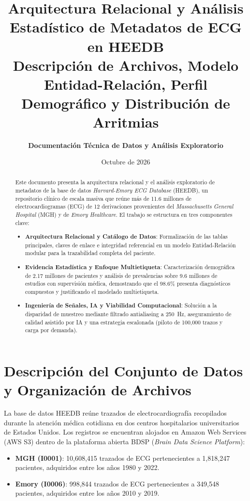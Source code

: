 \documentclass[11pt,a4paper]{article}
\title{\textbf{\LARGE Arquitectura Relacional y Análisis Estadístico de Metadatos de ECG en HEEDB}\\[0.25cm]
\large Descripción de Archivos, Modelo Entidad-Relación, Perfil Demográfico y Distribución de Arritmias}
\author{\textbf{Documentación Técnica de Datos y Análisis Exploratorio}}
\date{Octubre de 2026}
\begin{document}
\maketitle

\begin{abstract}
Este documento presenta la arquitectura relacional y el análisis exploratorio de metadatos de la base de datos \textit{Harvard-Emory ECG Database} (HEEDB), un repositorio clínico de escala masiva que reúne más de 11.6 millones de electrocardiogramas (ECG) de 12 derivaciones provenientes del \textit{Massachusetts General Hospital} (MGH) y de \textit{Emory Healthcare}. El trabajo se estructura en tres componentes clave:
\begin{itemize}[topsep=2pt, itemsep=1.5pt, parsep=0pt]
    \item \textbf{Arquitectura Relacional y Catálogo de Datos}: Formalización de las tablas principales, claves de enlace e integridad referencial en un modelo Entidad-Relación modular para la trazabilidad completa del paciente.
    \item \textbf{Evidencia Estadística y Enfoque Multietiqueta}: Caracterización demográfica de 2.17 millones de pacientes y análisis de prevalencias sobre 9.6 millones de estudios con supervisión médica, demostrando que el 98.6\% presenta diagnósticos compuestos y justificando el modelado multietiqueta.
    \item \textbf{Ingeniería de Señales, IA y Viabilidad Computacional}: Solución a la disparidad de muestreo mediante filtrado antialiasing a 250~Hz, aseguramiento de calidad asistido por IA y una estrategia escalonada (piloto de 100,000 trazos y carga por demanda).
\end{itemize}
\end{abstract}

\vspace{0.3cm}
\setcounter{tocdepth}{1}
\tableofcontents
\newpage

\section{Descripción del Conjunto de Datos y Organización de Archivos}

La base de datos HEEDB reúne trazados de electrocardiografía recopilados durante la atención médica cotidiana en dos centros hospitalarios universitarios de Estados Unidos. Los registros se encuentran alojados en Amazon Web Services (AWS S3) dentro de la plataforma abierta BDSP (\textit{Brain Data Science Platform}):
\begin{itemize}
    \item \textbf{MGH (I0001)}: 10,608,415 trazados de ECG pertenecientes a 1,818,247 pacientes, adquiridos entre los años 1980 y 2022.
    \item \textbf{Emory (I0006)}: 998,844 trazados de ECG pertenecientes a 349,548 pacientes, adquiridos entre los años 2010 y 2019.
\end{itemize}
\end{document}
